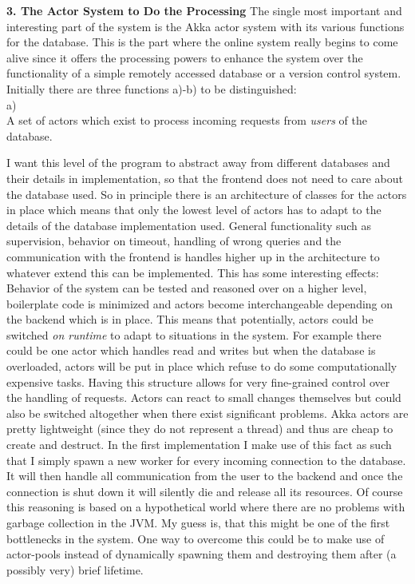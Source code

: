 \documentclass[11p]{scrartcl}
\begin{document}
\textbf{3. The Actor System to Do the Processing}
The single most important and interesting part of the system is the Akka actor system with its various functions for the database. This is the part where the online system really begins to come alive since it offers the processing powers to enhance the system over the functionality of a simple remotely accessed database or a version control system. 
Initially there are three functions a)-b) to be distinguished:\\

a)\\
A set of actors which exist to process incoming requests from \textit{users} of the database. 

I want this level of the program to abstract away from different databases and their details in implementation, so that the frontend does not need to care about the database used.
So in principle there is an architecture of classes for the actors in place which means that only the lowest level of actors has to adapt to the details of the database implementation used. General functionality such as supervision, behavior on timeout, handling of wrong queries and the communication with the frontend is handles higher up in the architecture to whatever extend this can be implemented.
This has some interesting effects:
Behavior of the system can be tested and reasoned over on a higher level, boilerplate code is minimized and actors become interchangeable depending on the backend which is in place. This means that potentially, actors could be switched \textit{on runtime} to adapt to situations in the system. For example there could be one actor which handles read and writes but when the database is overloaded, actors will be put in place which refuse to do some computationally expensive tasks. Having this structure allows for very fine-grained control over the handling of requests. Actors can react to small changes themselves but could also be switched altogether when there exist significant problems.
Akka actors are pretty lightweight (since they do not represent a thread) and thus are cheap to create and destruct. In the first implementation I make use of this fact as such that I simply spawn a new worker for every incoming connection to the database. It will then handle all communication from the user to the  backend  and once the connection is shut down it will silently die and release all its resources. Of course this reasoning is based on a hypothetical world where there are no problems with garbage collection in the JVM. My guess is, that this might be one of the first bottlenecks in the system. One way to overcome this could be to make use of actor-pools instead of dynamically spawning them and destroying them after (a possibly very) brief lifetime.
\end{document}
